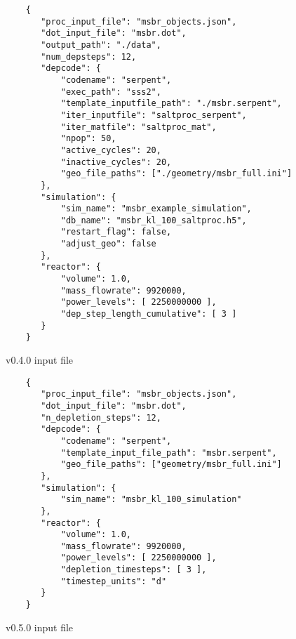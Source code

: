 \begin{listing}[!ht]
    \begin{verbatim}
    {
       "proc_input_file": "msbr_objects.json",
       "dot_input_file": "msbr.dot",
       "output_path": "./data",
       "num_depsteps": 12,
       "depcode": {
           "codename": "serpent",
           "exec_path": "sss2",
           "template_inputfile_path": "./msbr.serpent",
           "iter_inputfile": "saltproc_serpent",
           "iter_matfile": "saltproc_mat",
           "npop": 50,
           "active_cycles": 20,
           "inactive_cycles": 20,
           "geo_file_paths": ["./geometry/msbr_full.ini"]
       },
       "simulation": {
           "sim_name": "msbr_example_simulation",
           "db_name": "msbr_kl_100_saltproc.h5",
           "restart_flag": false,
           "adjust_geo": false
       },
       "reactor": {
           "volume": 1.0,
           "mass_flowrate": 9920000,
           "power_levels": [ 2250000000 ],
           "dep_step_length_cumulative": [ 3 ]
       }
    }
    \end{verbatim}
    \caption{\SaltProc v0.4.0 input file}
    \label{listing:2}
\end{listing}

\begin{listing}[!ht]
    \begin{verbatim}
    {
       "proc_input_file": "msbr_objects.json",
       "dot_input_file": "msbr.dot",
       "n_depletion_steps": 12,
       "depcode": {
           "codename": "serpent",
           "template_input_file_path": "msbr.serpent",
           "geo_file_paths": ["geometry/msbr_full.ini"]
       },
       "simulation": {
           "sim_name": "msbr_kl_100_simulation"
       },
       "reactor": {
           "volume": 1.0,
           "mass_flowrate": 9920000,
           "power_levels": [ 2250000000 ],
           "depletion_timesteps": [ 3 ],
           "timestep_units": "d"
       }
    }
    \end{verbatim}
    \caption{\SaltProc v0.5.0 input file}
    \label{listing:3}
\end{listing}
